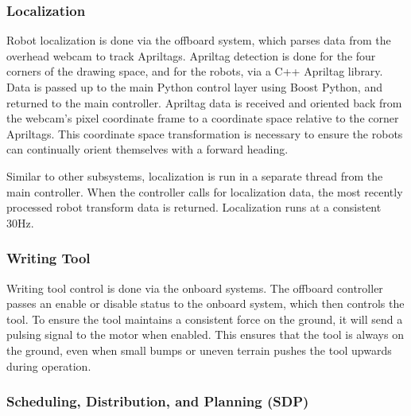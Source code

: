 \subsubsection{Localization}
\label{sec:sw_localization}
Robot localization is done via the offboard system, which parses data from the overhead webcam to track Apriltags. Apriltag detection is done for the four corners of the drawing space, and for the robots, via a C++ Apriltag library. Data is passed up to the main Python control layer using Boost Python, and returned to the main controller. Apriltag data is received and oriented back from the webcam's pixel coordinate frame to a coordinate space relative to the corner Apriltags. This coordinate space transformation is necessary to ensure the robots can continually orient themselves with a forward heading.

Similar to other subsystems, localization is run in a separate thread from the main controller. When the controller calls for localization data, the most recently processed robot transform data is returned. Localization runs at a consistent 30Hz.

\subsubsection{Writing Tool}
\label{sec:sw_writing}
Writing tool control is done via the onboard systems. The offboard controller passes an enable or disable status to the onboard system, which then controls the tool. To ensure the tool maintains a consistent force on the ground, it will send a pulsing signal to the motor when enabled. This ensures that the tool is always on the ground, even when small bumps or uneven terrain pushes the tool upwards during operation.

\subsubsection{Scheduling, Distribution, and Planning (SDP)}
\label{sec:sw_sdp}


